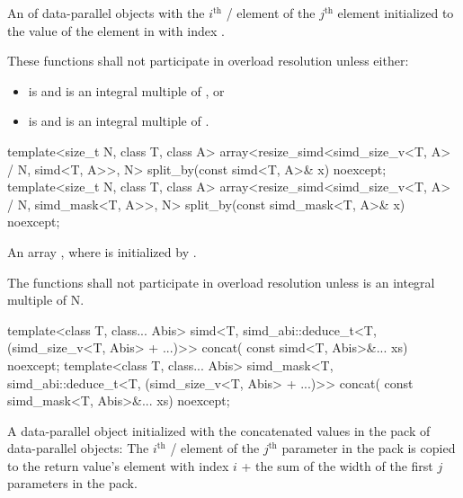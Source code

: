 \begin{itemdescr}
  \pnum\returns
  An  of data-parallel objects with the $i^\text{th}$ / element of the $j^\text{th}$  element initialized to the value of the element in  with index .

  \pnum\remarks
  These functions shall not participate in overload resolution unless either:
  \begin{itemize}
    \item {} is  and  is an integral multiple of , or
    \item {} is  and  is an integral multiple of .
  \end{itemize}
\end{itemdescr}

\begin{itemdecl}
template<size_t N, class T, class A>
  array<resize_simd<simd_size_v<T, A> / N, simd<T, A>>, N>
    split_by(const simd<T, A>& x) noexcept;
template<size_t N, class T, class A>
  array<resize_simd<simd_size_v<T, A> / N, simd_mask<T, A>>, N>
    split_by(const simd_mask<T, A>& x) noexcept;
\end{itemdecl}

\begin{itemdescr}
  \pnum\returns
  An array , where  is initialized by .

  \pnum\remarks
  The functions shall not participate in overload resolution unless  is an integral multiple of \tcode N.
\end{itemdescr}

\begin{itemdecl}
template<class T, class... Abis>
  simd<T, simd_abi::deduce_t<T, (simd_size_v<T, Abis> + ...)>> concat(
    const simd<T, Abis>&... xs) noexcept;
template<class T, class... Abis>
  simd_mask<T, simd_abi::deduce_t<T, (simd_size_v<T, Abis> + ...)>> concat(
    const simd_mask<T, Abis>&... xs) noexcept;
\end{itemdecl}

\begin{itemdescr}
  \pnum\returns
  A data-parallel object initialized with the concatenated values in the  pack of data-parallel objects: The $i^\text{th}$ / element of the $j^\text{th}$ parameter in the  pack is copied to the return value's element with index $i$ + the sum of the width of the first $j$ parameters in the  pack.
\end{itemdescr}

